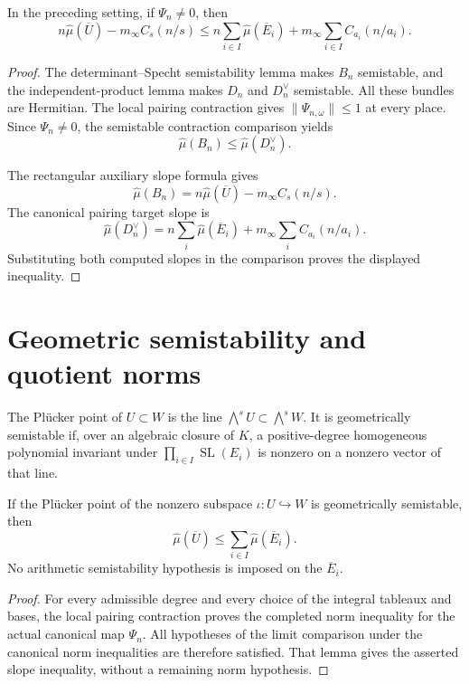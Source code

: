 \begin{lemma}
\label{lem:finite-degree-geometric-slope}
\leanok
In the preceding setting, if $\Psi_n\neq0$, then
\[
 n\widehat\mu(\overline U)-m_\infty C_s(n/s)
 \leq n\sum_{i\in I}\widehat\mu(\overline E_i)
       +m_\infty\sum_{i\in I}C_{a_i}(n/a_i).
\]
\end{lemma}
\begin{proof}
The determinant--Specht semistability lemma makes $B_n$ semistable, and the
independent-product lemma makes $D_n$ and $D_n^{\vee}$ semistable.
All these bundles are Hermitian.
The local pairing contraction gives $\|\Psi_{n,\omega}\|\leq1$ at every
place. Since $\Psi_n\neq0$, the semistable contraction comparison yields
\[
 \widehat\mu(B_n)\leq\widehat\mu(D_n^{\vee}).
\]

The rectangular auxiliary slope formula gives
\[
 \widehat\mu(B_n)=n\widehat\mu(\overline U)-m_\infty C_s(n/s).
\]
The canonical pairing target slope is
\[
 \widehat\mu(D_n^{\vee})
   =n\sum_i\widehat\mu(\overline E_i)+m_\infty\sum_i C_{a_i}(n/a_i).
\]
Substituting both computed slopes in the comparison proves the displayed
inequality.
\end{proof}

\section{Geometric semistability and quotient norms}

The Pl\"ucker point of $U\subset W$ is the line
$\bigwedge^s U\subset\bigwedge^s W$.
It is geometrically semistable if, over an algebraic closure of $K$, a
positive-degree homogeneous polynomial invariant under
$\prod_{i\in I}\operatorname{SL}(E_i)$ is nonzero on a nonzero vector of
that line.

\begin{theorem}
\label{thm:geometric-subspace-bound}
\leanok
If the Pl\"ucker point of the nonzero subspace $\iota:U\hookrightarrow W$
is geometrically semistable, then
\[
 \widehat\mu(\overline U)\leq\sum_{i\in I}\widehat\mu(\overline E_i).
\]
No arithmetic semistability hypothesis is imposed on the $\overline E_i$.
\end{theorem}
\begin{proof}
For every admissible degree and every choice of the integral tableaux and
bases, the local pairing contraction proves the completed norm inequality
for the actual canonical map $\Psi_n$. All hypotheses of the limit comparison
under the canonical norm inequalities are therefore satisfied. That lemma
gives the asserted slope inequality, without a remaining norm hypothesis.
\end{proof}

